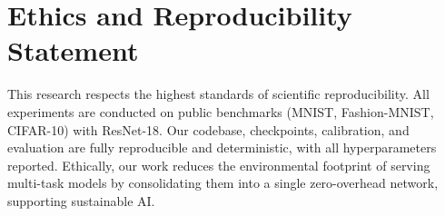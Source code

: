 \documentclass{article}
\theoremstyle{plain}
\theoremstyle{definition}
\theoremstyle{remark}
\begin{document}
\section*{Ethics and Reproducibility Statement}
This research respects the highest standards of scientific reproducibility. All experiments are conducted on public benchmarks (MNIST, Fashion-MNIST, CIFAR-10) with ResNet-18. Our codebase, checkpoints, calibration, and evaluation are fully reproducible and deterministic, with all hyperparameters reported. Ethically, our work reduces the environmental footprint of serving multi-task models by consolidating them into a single zero-overhead network, supporting sustainable AI.



\end{document}
